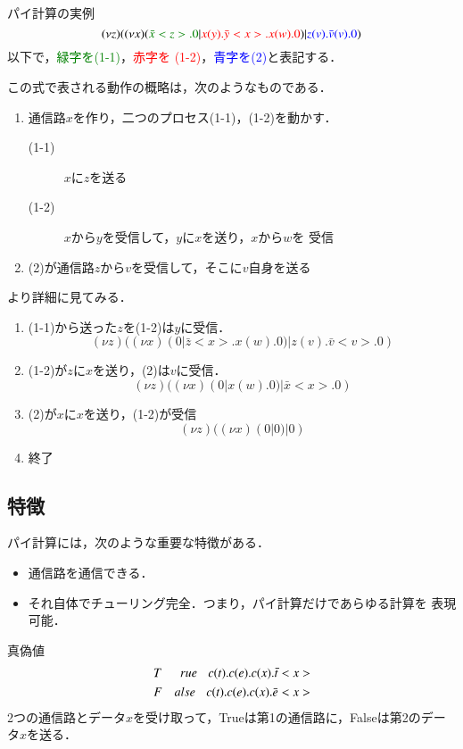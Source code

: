 \begin{myexample}{パイ計算の実例}
 \[
  (\nu z)  ( (\nu x) ( \textcolor{Green}{\bar{x}<z> . 0} | \textcolor{red}{x(y) . \bar{y} <x> . x(w) . 0}) |
 \textcolor{blue}{z(v) . \bar{v}(v) . 0})
 \]
 以下で，\textcolor{Green}{緑字を(1-1)}，\textcolor{red}{赤字を
 (1-2)}，\textcolor{blue}{青字を(2)}と表記する．

 この式で表される動作の概略は，次のようなものである．
 \begin{enumerate}
  \item 通信路$x$を作り，二つのプロセス(1-1)，(1-2)を動かす．
        \begin{description}
         \item[(1-1)] $x$に$z$を送る
         \item[(1-2)] $x$から$y$を受信して，$y$に$x$を送り，$x$から$w$を
                    受信
        \end{description}
        
  \item (2)が通信路$z$から$v$を受信して，そこに$v$自身を送る
 \end{enumerate}

 より詳細に見てみる．
 \begin{enumerate}
  \item (1-1)から送った$z$を(1-2)は$y$に受信．
        \[
         (\nu z) ( (\nu x) (0 | \bar{z}<x> . x(w) . 0) | z(v)
        . \bar{v}<v> . 0)
        \]
  \item (1-2)が$z$に$x$を送り，(2)は$v$に受信．
        \[
         (\nu z) ( (\nu x) (0 | x (w) . 0) | \bar{x} <x> . 0)
        \]
  \item (2)が$x$に$x$を送り，(1-2)が受信
        \[
         (\nu z) ((\nu x) (0 | 0) | 0)
        \]
  \item 終了
 \end{enumerate}
\end{myexample}

\subsection{特徴}
パイ計算には，次のような重要な特徴がある．
\begin{itemize}
 \item 通信路を通信できる．
 \item それ自体でチューリング完全．つまり，パイ計算だけであらゆる計算を
       表現可能．
\end{itemize}

\begin{myexample}{真偽値}
 \begin{eqnarray*}
 &T&rue  \hspace{2ex} c(t) . c(e) . c(x) . \bar{t} <x> \\
 &F&alse  \hspace{2ex} c(t) . c(e) . c(x) . \bar{e} <x>
\end{eqnarray*}
 2つの通信路とデータ$x$を受け取って，Trueは第1の通信路に，Falseは第2のデー
 タ$x$を送る．
\end{myexample}
